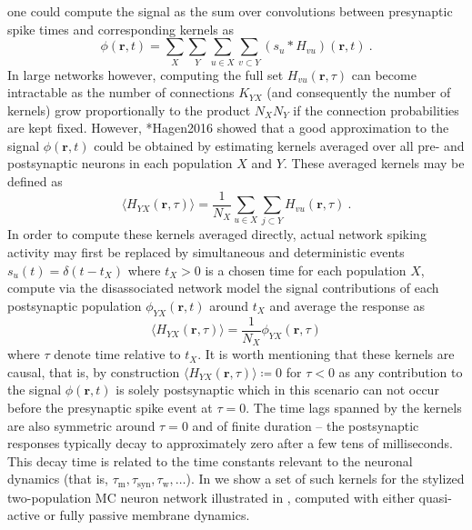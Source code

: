 one could compute the signal as the sum over convolutions between presynaptic spike times and corresponding kernels as
\begin{equation}
\phi(\mathbf{r}, t) = \sum_X \sum_Y \sum_{u \in X} \sum_{v \subset Y} \left(s_u \ast H_{vu} \right)(\mathbf{r}, t)~.
\end{equation}
In large networks however,
computing the full set $H_{vu}(\mathbf{r},\tau)$ can become intractable as the number of connections $K_{YX}$ (and consequently the number of kernels) grow proportionally to the product $N_X N_Y$ if the connection probabilities are kept fixed.
However, \citeasnoun**{Hagen2016} showed that a good approximation to the signal $\phi(\mathbf{r}, t)$ could be obtained by estimating kernels averaged over all pre- and postsynaptic neurons in each population $X$ and $Y$. These averaged kernels may be defined as
\begin{equation}
\langle H_{YX} (\mathbf{r}, \tau) \rangle = \frac{1}{N_X} \sum_{u \in X} \sum_{j \subset Y} H_{vu}(\mathbf{r}, \tau)~.
\end{equation}
In order to compute these kernels averaged directly,
actual network spiking activity may first be replaced by simultaneous and deterministic events
$s_u(t) = \delta(t - t_X)$ where $t_X > 0$ is a chosen time for each population $X$,
compute via the disassociated network model the signal contributions of each postsynaptic population $\phi_{YX}(\mathbf{r}, t)$ around $t_X$
and average the response as
\begin{equation}
\langle H_{YX} (\mathbf{r}, \tau) \rangle = \frac{1}{N_X} \phi_{YX} (\mathbf{r}, \tau)
\end{equation}
where $\tau$ denote time relative to $t_X$.
It is worth mentioning that these kernels are causal, that is,
by construction $\langle H_{YX}(\mathbf{r}, \tau) \rangle \coloneq 0$ for $\tau < 0$ as any contribution to the signal $\phi(\mathbf{r}, t)$ is solely postsynaptic which in this scenario can not occur before the presynaptic spike event at $\tau=0$.
The time lags spanned by the kernels are also symmetric around $\tau=0$ and of finite duration --
the postsynaptic responses typically decay to approximately zero after a few tens of milliseconds.
This decay time is related to the time constants relevant to the neuronal dynamics (that is, $\tau_\text{m}, \tau_\text{syn}, \tau_\text{w}, \ldots$).  
In  we show a set of such kernels for the stylized two-population MC neuron network illustrated in , 
computed with either quasi-active or fully passive membrane dynamics. 



